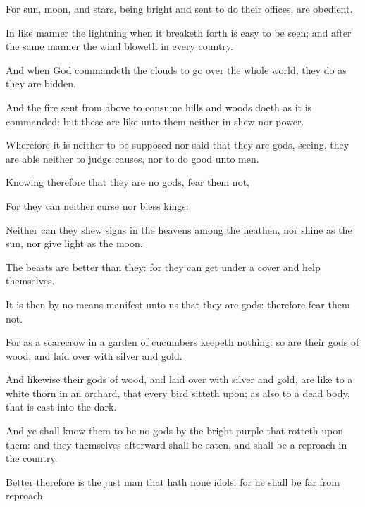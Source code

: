 {\par }{\PP {}For sun, moon, and stars, being bright and sent to do their offices, are obedient.
\par }{\PP {}In like manner the lightning when it breaketh forth is easy to be seen; and after the same manner the wind bloweth in every country.
\par }{\PP {}And when God commandeth the clouds to go over the whole world, they do as they are bidden.
\par }{\PP {}And the fire sent from above to consume hills and woods doeth as it is commanded: but these are like unto them neither in shew nor power.
\par }{\PP {}Wherefore it is neither to be supposed nor said that they are gods, seeing, they are able neither to judge causes, nor to do good unto men.
\par }{\PP {}Knowing therefore that they are no gods, fear them not,
\par }{\PP {}For they can neither curse nor bless kings:
\par }{\PP {}Neither can they shew signs in the heavens among the heathen, nor shine as the sun, nor give light as the moon.
\par }{\PP {}The beasts are better than they: for they can get under a cover and help themselves.
\par }{\PP {}It is then by no means manifest unto us that they are gods: therefore fear them not.
\par }{\PP {}For as a scarecrow in a garden of cucumbers keepeth nothing: so are their gods of wood, and laid over with silver and gold.
\par }{\PP {}And likewise their gods of wood, and laid over with silver and gold, are like to a white thorn in an orchard, that every bird sitteth upon; as also to a dead body, that is cast into the dark.
\par }{\PP {}And ye shall know them to be no gods by the bright purple that rotteth upon them: and they themselves afterward shall be eaten, and shall be a reproach in the country.
\par }{\PP {}Better therefore is the just man that hath none idols: for he shall be far from reproach.
\par }